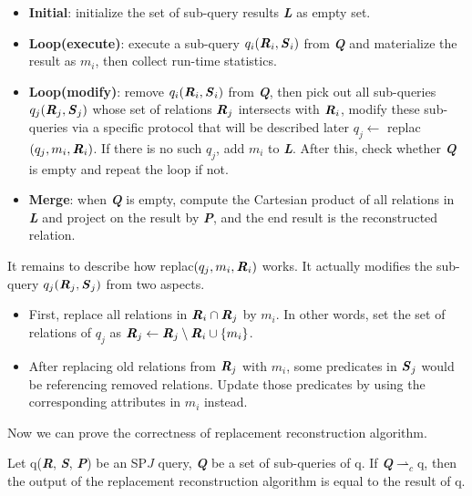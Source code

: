     \begin{itemize}[leftmargin = 15pt]
        \item \textbf{Initial}: initialize the set of sub-query results \textbf{\textit{L}} as empty set.
        \item \textbf{Loop(execute)}: execute a sub-query $q_i(\textbf{\textit{R}}_i,\textbf{\textit{S}}_i)$ from \textbf{\textit{Q}} and materialize the result as $m_i$, then collect run-time statistics. 
        \item \textbf{Loop(modify)}: remove $q_i(\textbf{\textit{R}}_i,\textbf{\textit{S}}_i)$ from \textbf{\textit{Q}}, then pick out all sub-queries $q_j(\textbf{\textit{R}}_j,\textbf{\textit{S}}_j)$ whose set of relations $\textbf{\textit{R}}_j$ intersects with $\textbf{\textit{R}}_i$, modify these sub-queries via a specific protocol that will be described later $q_j \gets$ replac$(q_j, m_i, \textbf{\textit{R}}_i)$. If there is no such $q_j$, add $m_i$ to \textbf{\textit{L}}. After this, check whether \textbf{\textit{Q}} is empty and repeat the loop if not.
        \item \textbf{Merge}: when \textbf{\textit{Q}} is empty, compute the Cartesian product of all relations in \textbf{\textit{L}} and project on the result by \textbf{\textit{P}}, and the end result is the reconstructed relation.
    \end{itemize}\par
    It remains to describe how replac$(q_j, m_i, \textbf{\textit{R}}_i)$ works. It actually modifies the sub-query $q_j(\textbf{\textit{R}}_j,\textbf{\textit{S}}_j)$ from two aspects.
    \begin{itemize}[leftmargin = 15pt]
        \item First, replace all relations in $\textbf{\textit{R}}_i \cap \textbf{\textit{R}}_j$ by $m_i$. In other words, set the set of relations of $q_j$ as $\textbf{\textit{R}}_j \gets \textbf{\textit{R}}_j \setminus \textbf{\textit{R}}_i \cup \{m_i\}$.
        \item After replacing old relations from $\textbf{\textit{R}}_j$ with $m_i$, some predicates in $\textbf{\textit{S}}_j$ would be referencing removed relations. Update those predicates by using the corresponding attributes in $m_i$ instead.
    \end{itemize}\par
    Now we can prove the correctness of replacement reconstruction algorithm.
    \begin{Theorem}[1] \label{Th1}
        Let q(\textbf{\textit{R}}, \textbf{\textit{S}}, \textbf{\textit{P}}) be an SP$J$ query, \textbf{\textit{Q}} be a set of sub-queries of q. If \textbf{\textit{Q}}$\rightharpoonup_c$q, then the output of the replacement reconstruction algorithm is equal to the result of q.
    \end{Theorem}\par
